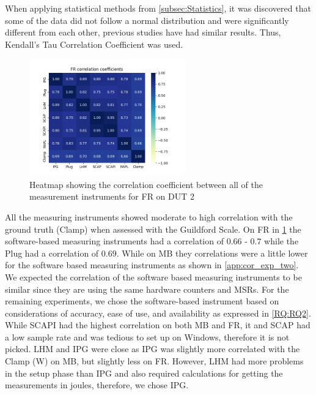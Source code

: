 When applying statistical methods from \cref{subsec:Statistics}, it was discovered that some of the data did not follow a normal distribution and were significantly different from each other, previous studies \cite{biksbois, Koedijk2022diff} have had similar results. Thus, Kendall's Tau Correlation Coefficient was used.%

\begin{figure}[H]
    \centering
    \hspace*{-1cm} %
    \includegraphics[width=0.6\textwidth]{figures/Fannkuch-redux_ex2.png}
    \caption{Heatmap showing the correlation coefficient between all of the measurement instruments for FR on DUT 2}
    \label{fig:fannkuchCorrDut2}
\end{figure}

All the measuring instruments showed moderate to high correlation with the ground truth (Clamp) when assessed with the Guildford Scale. On FR in \cref{fig:fannkuchCorrDut2} the software-based measuring instruments had a correlation of $0.66$ - $0.7$ while the Plug had a correlation of $0.69$. While on MB they correlations were a little lower for the software based measuring instruments as shown in \cref{app:cor_exp_two}. We expected the correlation of the software based measuring instruments to be similar since they are using the same hardware counters and MSRs. For the remaining experiments, we chose the software-based instrument based on considerations of accuracy, ease of use, and availability as expressed in \cref{RQ:RQ2}. While SCAPI had the highest correlation on both MB and FR, it and SCAP had a low sample rate and was tedious to set up on Windows, therefore it is not picked. LHM and IPG were close as IPG was slightly more correlated with the Clamp (W) on MB, but slightly less on FR. However, LHM had more problems in the setup phase than IPG and also required calculations for getting the measurements in joules, therefore, we chose IPG. %